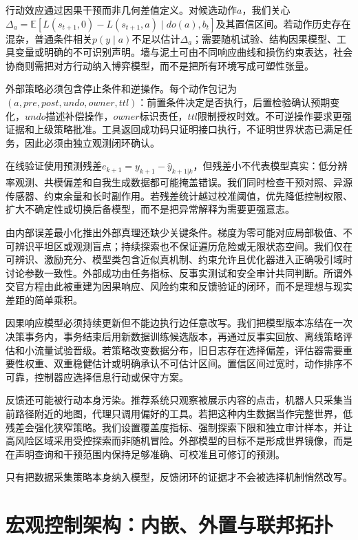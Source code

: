 行动效应通过因果干预而非几何差值定义。对候选动作$a$，我们关心$\Delta_a=\mathbb E[L(s_{t+1},0)-L(s_{t+1},a)\mid do(a),b_t]$及其置信区间。若动作历史存在混杂，普通条件相关$p(y\mid a)$不足以估计$\Delta_a$；需要随机试验、结构因果模型、工具变量或明确的不可识别声明。墙与泥土可由不同响应曲线和损伤约束表达，社会协商则需把对方行动纳入博弈模型，而不是把所有环境写成可塑性张量。

外部策略必须包含停止条件和逆操作。每个动作包记为$(a,pre,post,undo,owner,ttl)$：前置条件决定是否执行，后置检验确认预期变化，$undo$描述补偿操作，$owner$标识责任，$ttl$限制授权时效。不可逆操作要求更强证据和上级策略批准。工具返回成功码只证明接口执行，不证明世界状态已满足任务，因此必须由独立观测闭环确认。

在线验证使用预测残差$e_{k+1}=y_{k+1}-\hat y_{k+1|k}$，但残差小不代表模型真实：低分辨率观测、共模偏差和自我生成数据都可能掩盖错误。我们同时检查干预对照、异源传感器、约束余量和长时副作用。若残差统计越过校准阈值，优先降低控制权限、扩大不确定性或切换后备模型，而不是把异常解释为需要更强意志。

由内部误差最小化推出外部真理还缺少关键条件。梯度为零可能对应局部极值、不可辨识平坦区或观测盲点；持续探索也不保证遍历危险或无限状态空间。我们仅在可辨识、激励充分、模型类包含近似真机制、约束允许且优化器进入正确吸引域时讨论参数一致性。外部成功由任务指标、反事实测试和安全审计共同判断。所谓外交官方程由此被重建为因果响应、风险约束和反馈验证的闭环，而不是理想与现实差距的简单乘积。

因果响应模型必须持续更新但不能边执行边任意改写。我们把模型版本冻结在一次决策事务内，事务结束后用新数据训练候选版本，再通过反事实回放、离线策略评估和小流量试验晋级。若策略改变数据分布，旧日志存在选择偏差，评估器需要重要性权重、双重稳健估计或明确承认不可估计区间。置信区间过宽时，动作排序不可靠，控制器应选择信息行动或保守方案。

反馈还可能被行动本身污染。推荐系统只观察被展示内容的点击，机器人只采集当前路径附近的地图，代理只调用偏好的工具。若把这种内生数据当作完整世界，低残差会强化狭窄策略。我们设置覆盖度指标、强制探索下限和独立审计样本，并让高风险区域采用受控探索而非随机冒险。外部模型的目标不是形成世界镜像，而是在声明查询和干预范围内保持足够准确、可校准且可修订的预测。

只有把数据采集策略本身纳入模型，反馈闭环的证据才不会被选择机制悄然改写。

\section{宏观控制架构：内嵌、外置与联邦拓扑}
\label{sec:section_9649}

